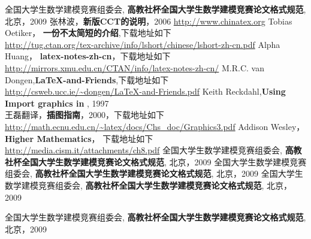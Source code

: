\documentclass[UTF8]{ctexart}
\begin{document}
\begin{thebibliography}{10}
 全国大学生数学建模竞赛组委会, \textbf{高教社杯全国大学生数学建模竞赛论文格式规范}, 北京，2009
张林波，\textbf{新版CCT的说明}，2006
 \url{http://www.chinatex.org}
Tobias Oetiker， \textbf{一份不太简短的\LaTeXe 介绍},{下载地址如下}\\
    \url{http://tug.ctan.org/tex-archive/info/lshort/chinese/lshort-zh-cn.pdf}
 Alpha Huang， \textbf{latex-notes-zh-cn}，下载地址如下\\
    \url{http://mirrors.xmu.edu.cn/CTAN/info/latex-notes-zh-cn/}
M.R.C. van Dongen,\textbf{\LaTeX-and-Friends},下载地址如下\\
    \url{http://csweb.ucc.ie/~dongen/LaTeX-and-Friends.pdf}
Keith Reckdahl,\textbf{Using Import graphics in \LaTeXe}, 1997\\
王磊翻译，\textbf{\LaTeXe 插图指南}，2000，下载地址如下\\
\url{http://math.ecnu.edu.cn/~latex/docs/Chs_doc/Graphics3.pdf}
Addison Wesley，\textbf{Higher Mathematics}， 下载地址如下\\ \url{http://media.cism.it/attachments/ch8.pdf}
 全国大学生数学建模竞赛组委会, \textbf{高教社杯全国大学生数学建模竞赛论文格式规范}, 北京，2009
 全国大学生数学建模竞赛组委会, \textbf{高教社杯全国大学生数学建模竞赛论文格式规范}, 北京，2009
 全国大学生数学建模竞赛组委会, \textbf{高教社杯全国大学生数学建模竞赛论文格式规范}, 北京，2009

 全国大学生数学建模竞赛组委会, \textbf{高教社杯全国大学生数学建模竞赛论文格式规范}, 北京，2009
\end{thebibliography}
\end{document}
